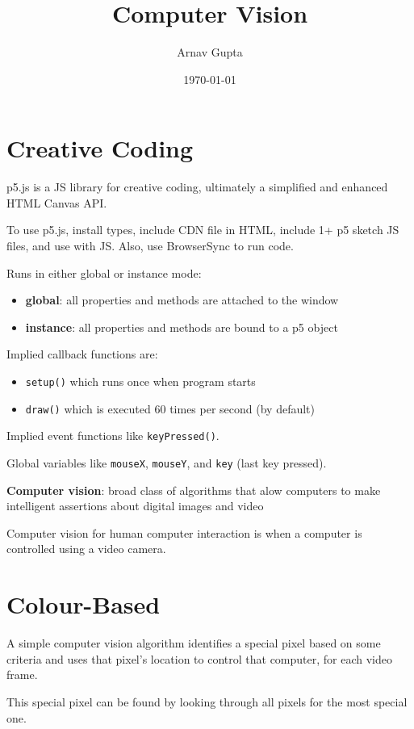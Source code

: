\documentclass[11pt]{article}
\author{Arnav Gupta}
\date{\today}
\title{Computer Vision}
\begin{document}
\maketitle
\tableofcontents

\section{Creative Coding}
\label{sec:orgebd34a3}
p5.js is a JS library for creative coding, ultimately a simplified and enhanced HTML Canvas API.

To use p5.js, install types, include CDN file in HTML, include 1+ p5 sketch JS files,
and use with JS.
Also, use BrowserSync to run code.

Runs in either global or instance mode:
\begin{itemize}
\item \textbf{global}: all properties and methods are attached to the window
\item \textbf{instance}: all properties and methods are bound to a p5 object
\end{itemize}

Implied callback functions are:
\begin{itemize}
\item \texttt{setup()} which runs once when program starts
\item \texttt{draw()} which is executed 60 times per second (by default)
\end{itemize}

Implied event functions like \texttt{keyPressed()}.

Global variables like \texttt{mouseX}, \texttt{mouseY}, and \texttt{key} (last key pressed).

\textbf{Computer vision}: broad class of algorithms that alow computers to make intelligent
assertions about digital images and video

Computer vision for human computer interaction is when a computer is controlled using a
video camera.
\section{Colour-Based}
\label{sec:org5688349}
A simple computer vision algorithm identifies a special pixel based on some criteria and
uses that pixel's location to control that computer, for each video frame.

This special pixel can be found by looking through all pixels for the most special one.
\end{document}
